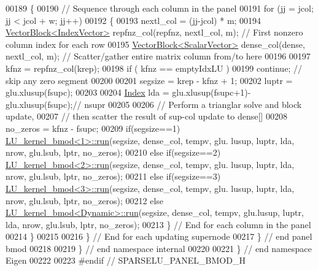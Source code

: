 \begin{DoxyCode}
00189     \{
00190       \textcolor{comment}{// Sequence through each column in the panel}
00191       \textcolor{keywordflow}{for} (jj = jcol; jj < jcol + w; jj++)
00192       \{
00193         nextl\_col = (jj-jcol) * m; 
00194         \hyperlink{group___core___module_class_eigen_1_1_vector_block}{VectorBlock<IndexVector>} repfnz\_col(repfnz, nextl\_col, m); \textcolor{comment}{// First nonzero
       column index for each row}
00195         \hyperlink{group___core___module_class_eigen_1_1_vector_block}{VectorBlock<ScalarVector>} dense\_col(dense, nextl\_col, m); \textcolor{comment}{//
       Scatter/gather entire matrix column from/to here}
00196         
00197         kfnz = repfnz\_col(krep); 
00198         \textcolor{keywordflow}{if} ( kfnz == emptyIdxLU ) 
00199           \textcolor{keywordflow}{continue}; \textcolor{comment}{// skip any zero segment}
00200         
00201         segsize = krep - kfnz + 1;
00202         luptr = glu.xlusup(fsupc);
00203         
00204         \hyperlink{namespace_eigen_a62e77e0933482dafde8fe197d9a2cfde}{Index} lda = glu.xlusup(fsupc+1)-glu.xlusup(fsupc);\textcolor{comment}{// nsupr}
00205         
00206         \textcolor{comment}{// Perform a trianglar solve and block update, }
00207         \textcolor{comment}{// then scatter the result of sup-col update to dense[]}
00208         no\_zeros = kfnz - fsupc; 
00209               \textcolor{keywordflow}{if}(segsize==1)  \hyperlink{struct_eigen_1_1internal_1_1_l_u__kernel__bmod}{LU\_kernel\_bmod<1>::run}(segsize, dense\_col, tempv, glu.
      lusup, luptr, lda, nrow, glu.lsub, lptr, no\_zeros);
00210         \textcolor{keywordflow}{else}  \textcolor{keywordflow}{if}(segsize==2)  \hyperlink{struct_eigen_1_1internal_1_1_l_u__kernel__bmod}{LU\_kernel\_bmod<2>::run}(segsize, dense\_col, tempv, glu.
      lusup, luptr, lda, nrow, glu.lsub, lptr, no\_zeros);
00211         \textcolor{keywordflow}{else}  \textcolor{keywordflow}{if}(segsize==3)  \hyperlink{struct_eigen_1_1internal_1_1_l_u__kernel__bmod}{LU\_kernel\_bmod<3>::run}(segsize, dense\_col, tempv, glu.
      lusup, luptr, lda, nrow, glu.lsub, lptr, no\_zeros);
00212         \textcolor{keywordflow}{else}                  \hyperlink{struct_eigen_1_1internal_1_1_l_u__kernel__bmod}{LU\_kernel\_bmod<Dynamic>::run}(segsize, dense\_col, 
      tempv, glu.lusup, luptr, lda, nrow, glu.lsub, lptr, no\_zeros); 
00213       \} \textcolor{comment}{// End for each column in the panel }
00214     \}
00215     
00216   \} \textcolor{comment}{// End for each updating supernode}
00217 \} \textcolor{comment}{// end panel bmod}
00218 
00219 \} \textcolor{comment}{// end namespace internal}
00220 
00221 \} \textcolor{comment}{// end namespace Eigen}
00222 
00223 \textcolor{preprocessor}{#endif // SPARSELU\_PANEL\_BMOD\_H}
\end{DoxyCode}

